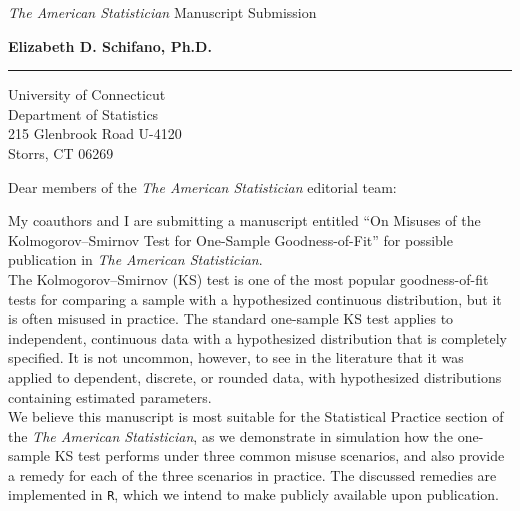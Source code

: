 \documentclass{letter} %
\begin{document}
\signature{Elizabeth D. Schifano \\elizabeth.schifano@uconn.edu \\Corresponding Author}           %
\longindentation=0pt                       %
\let\raggedleft\raggedright                %


\begin{letter}{

\textit{The American Statistician} Manuscript Submission}


\begin{flushleft}
{\large\bf Elizabeth D. Schifano, Ph.D.}
\end{flushleft}
\medskip\hrule height 1pt
\begin{flushright}
\hfill University of Connecticut \\
\hfill Department of Statistics \\ 
\hfill 215 Glenbrook Road U-4120 \\
\hfill Storrs, CT 06269
\end{flushright}
\vfill %

\opening{Dear members of the \textit{The American Statistician} editorial team:}
\vspace{.25in}

\noindent My coauthors and I are submitting a manuscript entitled ``On Misuses 
of the Kolmogorov–Smirnov Test
for One-Sample Goodness-of-Fit'' for possible publication 
in \emph{The American Statistician}.\\

The Kolmogorov–Smirnov (KS) test is one of the most popular goodness-of-fit
tests for comparing a sample with a hypothesized continuous distribution, but it 
is often misused in practice. The standard one-sample KS test applies to
independent, continuous data with a hypothesized distribution that is completely
specified. It is not uncommon, however, to see in the literature that it was 
applied to dependent, discrete, or rounded data, with hypothesized distributions 
containing estimated parameters. \\

We believe this manuscript is most suitable for the Statistical Practice section 
of the \emph{The American Statistician}, as we demonstrate in simulation how the  
one-sample KS test performs under three common misuse scenarios, and also 
provide a remedy for each of the three scenarios in practice. The 
discussed remedies are implemented in \texttt{R}, which we intend to make 
publicly available upon publication.\\  


\end{letter}
\end{document}
